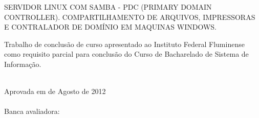 \begin{folhadeaprovacao}
    \setlength{\ABNTsignthickness}{0.4pt}
    \setlength{\ABNTsignwidth}{15cm}
    \setlength{\ABNTsignskip}{0.9cm}
    \begin{center}
	{\large SERVIDOR LINUX COM SAMBA - PDC (PRIMARY DOMAIN CONTROLLER). COMPARTILHAMENTO DE ARQUIVOS, IMPRESSORAS E CONTRALADOR DE DOMÍNIO EM MAQUINAS WINDOWS.}\\ [2cm]
        \hspace{.45\textwidth} %
        \begin{minipage}{0.5\textwidth}
        \begin{espacosimples}
        Trabalho de conclusão de curso apresentado ao Instituto Federal Fluminense como requisito parcial para conclusão do Curso de Bacharelado de Sistema de Informação.\\\\
        \end{espacosimples}
        \end{minipage}
    \end{center}
    Aprovada em  de Agosto de 2012 \\\\
    Banca avaliadora:
\end{folhadeaprovacao}

